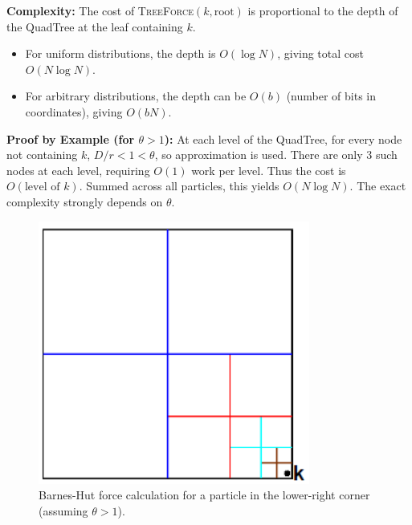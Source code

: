 \documentclass[12pt]{book}
\begin{document}
\textbf{Complexity:} The cost of \textsc{TreeForce}$(k,\text{root})$ is proportional to the depth of the QuadTree at the leaf containing $k$.  

\begin{itemize}
    \item For uniform distributions, the depth is $O(\log N)$, giving total cost $O(N\log N)$.
    \item For arbitrary distributions, the depth can be $O(b)$ (number of bits in coordinates), giving $O(bN)$.
\end{itemize}

\textbf{Proof by Example (for $\theta > 1$):}  
At each level of the QuadTree, for every node not containing $k$, $D/r < 1 < \theta$, so approximation is used. There are only 3 such nodes at each level, requiring $O(1)$ work per level. Thus the cost is $O(\text{level of }k)$. Summed across all particles, this yields $O(N \log N)$. The exact complexity strongly depends on $\theta$.  

\begin{figure}[ht]
    \centering
    \includegraphics[width=0.5\linewidth]{images/nbidysim3.png}
    \caption{Barnes-Hut force calculation for a particle in the lower-right corner (assuming $\theta > 1$).}
    \label{fig:BHforcecalc}
\end{figure}
\end{document}
